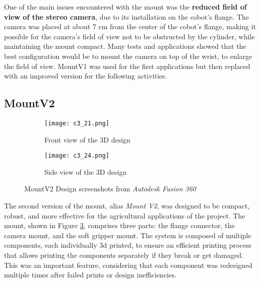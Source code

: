 One of the main issues encountered with the mount was the \textbf{reduced field of view of the stereo camera}, due to its
installation on the cobot's flange. The camera was placed at about $7$ cm from the center of the cobot's flange,
making it possible for the camera's field of view not to be obstructed by the cylinder,
while maintaining the mount compact.
Many tests and applications showed that the best configuration would be to mount the camera on top of the wrist,
to enlarge the field of view. MountV1 was used for the first applications but then replaced with an
improved version for the following activities.

\subsection{MountV2}

\begin{figure}
    \centering

    \begin{subfigure}{\textwidth}
        \texttt{[image: c3\_21.png]} %
        \caption{Front view of the 3D design}
        \label{fig:frontv2}
    \end{subfigure}
    
    \vspace{1em} %

    \begin{subfigure}{\textwidth}
        \texttt{[image: c3\_24.png]} %
        \caption{Side view of the 3D design}
        \label{fig:sidev2}
    \end{subfigure}

    \caption{MountV2 Design screenshots from \textit{Autodesk Fusion 360}}
    \label{fig:mountv2}
\end{figure}

The second version of the mount, alias \textit{Mount V2}, was designed to be compact, robust, and more effective
for the agricultural applications of the project. The mount,
shown in Figure \ref{fig:mountv2}, comprises three parts:
the flange connector, the camera mount, and the soft gripper mount. The system is composed of multiple components,
each individually 3d printed, to ensure an efficient printing process that allows printing the components separately
if they break or get damaged. This was an important feature, considering that each component was redesigned multiple
times after failed prints or design inefficiencies.

